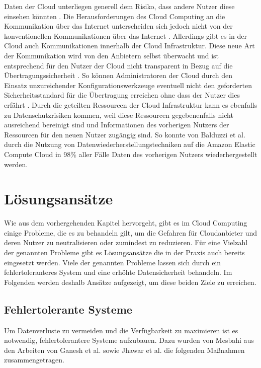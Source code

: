 Daten der Cloud unterliegen generell dem Risiko, dass andere Nutzer diese einsehen könnten \cite{ali2015}. 
Die Herausforderungen des Cloud Computing an die Kommunikation über das Internet unterscheiden sich jedoch nicht von der konventionellen Kommunikationen über das Internet \cite{ali2015}. 
Allerdings gibt es in der Cloud auch Kommunikationen innerhalb der Cloud Infrastruktur. Diese neue Art der Kommunikation wird von den Anbietern selbst überwacht und ist entsprechend für den Nutzer der Cloud nicht transparent in Bezug auf die Übertragungssicherheit \cite{ali2015}. 
So können Administratoren der Cloud durch den Einsatz unzureichender Konfigurationswerkzeuge eventuell nicht den geforderten Sicherheitsstandard für die Übertragung erreichen ohne dass der Nutzer dies erfährt \cite{dinh2013}.
Durch die geteilten Ressourcen der Cloud Infrastruktur kann es ebenfalls zu Datenschutzrisiken kommen, weil diese Ressourcen gegebenenfalls nicht ausreichend bereinigt sind und Informationen des vorherigen Nutzers der Ressourcen für den neuen Nutzer zugängig sind. So konnte von Balduzzi et al. \cite{balduzzi2012} durch die Nutzung von Datenwiederherstellungstechniken auf die Amazon Elastic Compute Cloud in 98\% aller Fälle Daten des vorherigen Nutzers wiederhergestellt werden. 

\section{Lösungsansätze}
Wie aus dem vorhergehenden Kapitel hervorgeht, gibt es im Cloud Computing einige Probleme, die es zu behandeln gilt, um die Gefahren für Cloudanbieter und deren Nutzer zu neutralisieren oder zumindest zu reduzieren. 
Für eine Vielzahl der genannten Probleme gibt es Lösungsansätze die in der Praxis auch bereits eingesetzt werden. 
Viele der genannten Probleme lassen sich durch ein fehlertoleranteres System und eine erhöhte Datensicherheit behandeln. Im Folgenden werden deshalb Ansätze aufgezeigt, um diese beiden Ziele zu erreichen.

\subsection{Fehlertolerante Systeme}
Um Datenverluste zu vermeiden und die Verfügbarkeit zu maximieren ist es notwendig, fehlertolerantere Systeme aufzubauen. Dazu wurden von Mesbahi \cite{mesbahi2018} aus den Arbeiten von Ganesh et al. \cite{ganesh2014} sowie Jhawar et al. \cite{jhawar2013} die folgenden Maßnahmen zusammengetragen.

